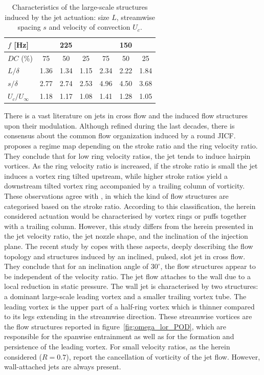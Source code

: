 \begin{table}[]
\centering
\begin{tabular}{lcccccc}
\toprule
$f$ {[}Hz{]} & \multicolumn{3}{c}{225} & \multicolumn{3}{c}{150} \\ \midrule
$DC$ (\%) & 75 & 50 & 25 & 75 & 50 & 25 \\ \midrule
$L/\delta$ & 1.36 & 1.34 & 1.15 & 2.34 & 2.22 & 1.84 \\
$s/\delta$ & 2.77 & 2.74 & 2.53 & 4.96 & 4.50 & 3.68 \\
$U_c/U_\infty$ & 1.18 & 1.17 & 1.08 & 1.41 & 1.28 & 1.05 \\ \bottomrule
\end{tabular}
\caption{Characteristics of the large-scale structures induced by the jet actuation: size $L$, streamwise spacing $s$ and velocity of convection $U_c$.}\label{tab:cohstruct}
\end{table}

There is a vast literature on jets in cross flow and the induced flow structures upon their modulation. Although refined during the last decades, there is consensus about the common flow organization induced by a round JICF. \citet{Sau2010optJICF} proposes a regime map depending on the stroke ratio and the ring velocity ratio. They conclude that for low ring velocity ratios, the jet tends to induce hairpin vortices. As the ring velocity ratio is increased, if the stroke ratio is small the jet induces a vortex ring tilted upstream, while higher stroke ratios yield a downstream tilted vortex ring accompanied by a trailing column of vorticity. These observations agree with \citet{Johari2006scaling}, in which the kind of flow structures are categorised based on the stroke ratio. According to this classification, the herein considered actuation would be characterised by vortex rings or puffs together with a trailing column. However, this study differs from the herein presented in the jet velocity ratio, the jet nozzle shape, and the inclination of the injection plane. The recent study by \citet{Steinfurth2021pulsedjet} copes with these aspects, deeply describing the flow topology and structures induced by an inclined, pulsed, slot jet in cross flow. They conclude that for an inclination angle of $30^\circ$, the flow structures appear to be independent of the velocity ratio. The jet flow attaches to the wall due to a local reduction in static pressure. The wall jet is characterised by two structures: a dominant large-scale leading vortex and a smaller trailing vortex tube. The leading vortex is the upper part of a half-ring vortex which is thinner compared to its legs extending in the streamwise direction. These streamwise vortices are the flow structures reported in figure~\ref{fig:omega_lor_POD}, which are responsible for the spanwise entrainment as well as for the formation and persistence of the leading vortex. For small velocity ratios, as the herein considered ($R = 0.7$), \citet{Steinfurth2021pulsedjet} report the cancellation of vorticity of the jet flow. However, wall-attached jets are always present. 

